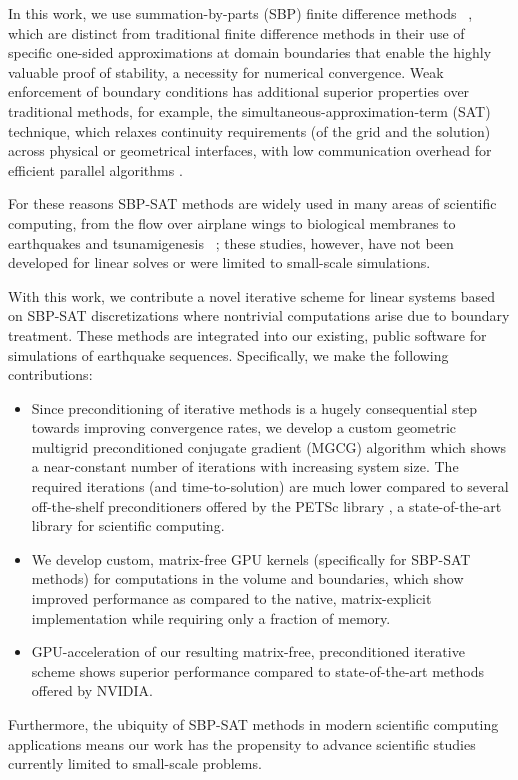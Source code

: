 In this work, we use summation-by-parts (SBP) finite difference
methods ~\cite{KS74, Strand94, MN04, SVARD201417}, which are distinct from traditional finite difference
methods in their use of specific one-sided approximations at domain boundaries that enable the highly valuable proof of stability, a necessity for numerical convergence. Weak enforcement of boundary conditions has additional superior properties over traditional methods, for example, the simultaneous-approximation-term (SAT) technique, which relaxes continuity requirements (of the grid and the solution) across physical or geometrical interfaces, with low communication overhead for efficient parallel algorithms \cite{Fernandez2014}.

For these reasons SBP-SAT methods are widely used in many areas of scientific computing, from the flow over airplane wings to biological membranes to earthquakes and tsunamigenesis ~\cite{Ying2007, NordstromEriksson2010, Swim2011, petersson_stable, Lotto2015, EricksonDay2016}; these studies, however, have not been developed for linear solves or were limited to small-scale simulations. 


With this work, we contribute a novel iterative scheme for linear systems based on SBP-SAT discretizations where nontrivial computations arise due to boundary treatment. These methods are integrated into our existing, public software for simulations of earthquake sequences. Specifically, we make the following contributions: 
\begin{itemize}
\item Since preconditioning of iterative methods is a hugely consequential step towards improving convergence rates, we develop a custom geometric multigrid preconditioned conjugate gradient (MGCG) algorithm which shows a near-constant number of iterations with increasing system size. The required iterations (and time-to-solution) are much lower compared to several off-the-shelf preconditioners offered by the PETSc library \cite{petsc-web-page}, a state-of-the-art library for scientific computing.
\item We develop custom, matrix-free GPU kernels (specifically for SBP-SAT methods) for computations in the volume and boundaries, which show improved performance as compared to the native, matrix-explicit implementation while requiring only a fraction of memory. 
\item GPU-acceleration of our resulting matrix-free, preconditioned iterative scheme shows superior performance compared to state-of-the-art methods offered by NVIDIA.
\end{itemize} 
%
Furthermore, the ubiquity of SBP-SAT methods in modern scientific computing applications means our work has the propensity to advance scientific studies currently limited to small-scale problems.

